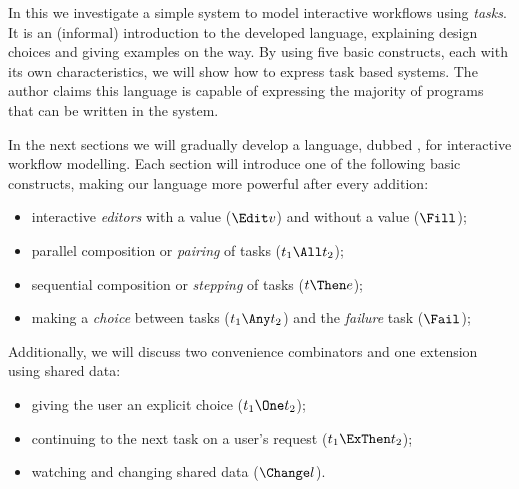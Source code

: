 
In this we investigate a simple system to model interactive workflows using \emph{tasks}.
It is an (informal) introduction to the developed language,
explaining design choices and giving examples on the way.
By using five basic constructs,
each with its own characteristics,
we will show how to express task based systems.
The author claims this language is capable of expressing the majority of programs that can be written in the \ITASKS \cite{plasmeijer2011itasks} system.

In the next sections we will gradually develop a language, dubbed \Lang, for interactive workflow modelling.
Each section will introduce one of the following basic constructs,
making our language more powerful after every addition:
\begin{itemize}
  \item interactive \emph{editors} with a value ($\Edit v$) and without a value ($\Fill$);
  \item parallel composition or \emph{pairing} of tasks ($t_1 \All t_2$);
  \item sequential composition or \emph{stepping} of tasks ($t \Then e$);
  \item making a \emph{choice} between tasks ($t_1 \Any t_2$) and the \emph{failure} task ($\Fail$);
\end{itemize}
Additionally, we will discuss two convenience combinators and one extension using shared data:
\begin{itemize}
  \item giving the user an explicit choice ($t_1 \One t_2$);
  \item continuing to the next task on a user's request ($t_1 \ExThen t_2$);
  \item watching and changing shared data ($\Change l$).
\end{itemize}

